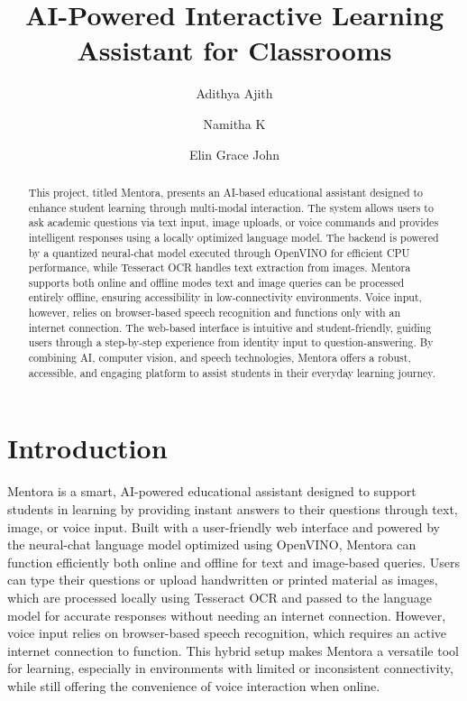 \documentclass{josis}
\begin{document}


\title{AI-Powered Interactive Learning Assistant for Classrooms}

\author{Adithya Ajith}
\author{Namitha K }
\author{Elin Grace John}
\date{}
\maketitle
\begin{abstract}
This project, titled Mentora, presents an AI-based educational assistant designed to enhance student learning through multi-modal interaction. The system allows users to ask academic questions via text input, image uploads, or voice commands and provides intelligent responses using a locally optimized language model. The backend is powered by a quantized neural-chat model executed through OpenVINO for efficient CPU performance, while Tesseract OCR handles text extraction from images. Mentora supports both online and offline modes text and image queries can be processed entirely offline, ensuring accessibility in low-connectivity environments. Voice input, however, relies on browser-based speech recognition and functions only with an internet connection. The web-based interface is intuitive and student-friendly, guiding users through a step-by-step experience from identity input to question-answering. By combining AI, computer vision, and speech technologies, Mentora offers a robust, accessible, and engaging platform to assist students in their everyday learning journey.

\end{abstract}
\section{Introduction}
Mentora is a smart, AI-powered educational assistant designed to support students in learning by providing instant answers to their questions through text, image, or voice input. Built with a user-friendly web interface and powered by the neural-chat language model optimized using OpenVINO, Mentora can function efficiently both online and offline for text and image-based queries. Users can type their questions or upload handwritten or printed material as images, which are processed locally using Tesseract OCR and passed to the language model for accurate responses without needing an internet connection. However, voice input relies on browser-based speech recognition, which requires an active internet connection to function. This hybrid setup makes Mentora a versatile tool for learning, especially in environments with limited or inconsistent connectivity, while still offering the convenience of voice interaction when online.
\end{document}
